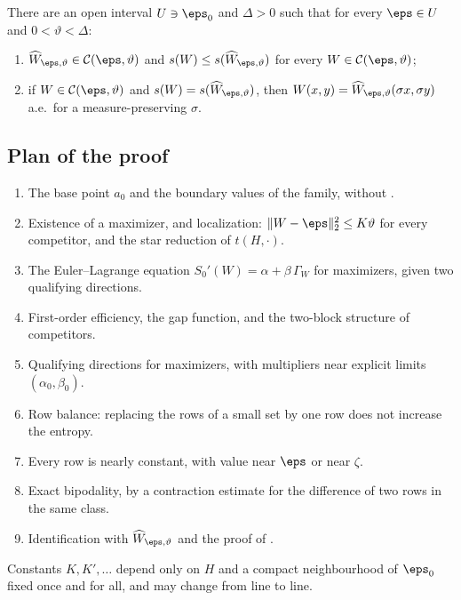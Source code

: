 \begin{theorem}\label{kb:thm:main}
There are an open interval $U\ni\eps_0$ and $\Delta>0$ such that for every
$\eps\in U$ and $0<\vartheta<\Delta$:
\begin{enumerate}
\item $\widehat W_{\eps,\vartheta}\in\mathcal C(\eps,\vartheta)$ and
  $s(W)\le s(\widehat W_{\eps,\vartheta})$ for every
  $W\in\mathcal C(\eps,\vartheta)$;
\item if $W\in\mathcal C(\eps,\vartheta)$ and
  $s(W)=s(\widehat W_{\eps,\vartheta})$, then
  $W(x,y)=\widehat W_{\eps,\vartheta}(\sigma x,\sigma y)$ a.e.\ for a
  measure-preserving $\sigma$.
\end{enumerate}
\end{theorem}

\subsection{Plan of the proof}

\begin{enumerate}
\item[\S\ref{kb:sec:base}] The base point $a_0$ and the boundary values of
  the family, without \cite{kenyon2014entropy}.
\item[\S\ref{kb:sec:local}] Existence of a maximizer, and
  localization: $\|W-\eps\|_2^2\le K\vartheta$ for every competitor, and
  the star reduction of $t(H,\cdot)$.
\item[\S\ref{kb:sec:el}] The Euler--Lagrange equation
  $S_0'(W)=\alpha+\beta\,\Gamma_W$ for maximizers, given two qualifying directions.
\item[\S\ref{kb:sec:efficiency}--\ref{kb:sec:structure}] First-order efficiency, the
  gap function, and the two-block structure of competitors.
\item[\S\ref{kb:sec:cluster}] Qualifying directions for maximizers, with multipliers near
  explicit limits $(\alpha_0,\beta_0)$.
\item[\S\ref{kb:sec:row}] Row balance: replacing the rows of a small set by one row does not
  increase the entropy.
\item[\S\ref{kb:sec:pointwise}] Every row is nearly constant, with value near $\eps$ or near
  $\zeta$.
\item[\S\ref{kb:sec:bip}] Exact bipodality, by a contraction estimate for the difference of
  two rows in the same class.
\item[\S\ref{kb:sec:ident}] Identification with $\widehat W_{\eps,\vartheta}$
  and the proof of .
\end{enumerate}
Constants $K,K',\dots$ depend only on $H$ and a compact neighbourhood of
$\eps_0$ fixed once and for all, and may change from line to line.

